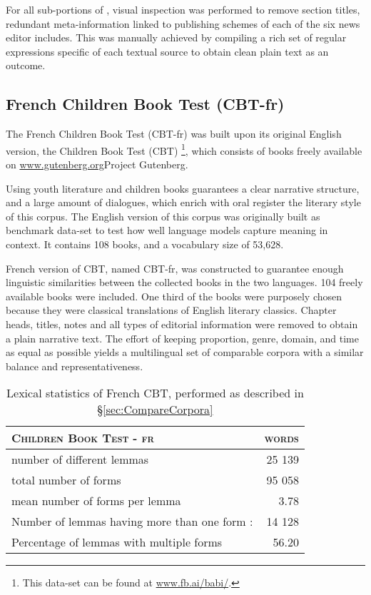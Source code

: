 For all sub-portions of \Cabernet, visual inspection was performed to remove section titles, redundant meta-information linked to publishing schemes of each of the six news editor includes. This was manually achieved by compiling a rich set of regular expressions specific of each textual source to obtain clean plain text as an outcome.


\subsection{French Children Book Test (CBT-fr)}
\label{subsec:DescribeCBT}

The French Children Book Test (CBT-fr) was built upon its original English version, the Children Book Test (CBT) \citet{hill-etal-2016-the}\footnote{This data-set can be found at \url{www.fb.ai/babi/}.}, which consists of books freely available on \url{www.gutenberg.org}{Project Gutenberg}.

Using youth literature and children books guarantees a clear narrative structure, and a large amount of dialogues, which enrich with oral register the literary style of this corpus.
The English version of this corpus was originally built as benchmark data-set to test how well language models capture meaning in context. It contains 108 books, and a vocabulary size of 53,628.

French version of CBT, named CBT-fr, was constructed to guarantee enough linguistic similarities between the collected books in the two languages. 104 freely available books were included. One third of the books were purposely chosen because they were classical translations of English literary classics. %
Chapter heads, titles, notes and all types of editorial information were removed to obtain a plain narrative text. The effort of keeping proportion, genre, domain, and time as equal as possible yields a multilingual set of comparable corpora with a similar balance and representativeness.

\begin{table}[ht]
    \centering\small
        \begin{tabular}{lr}                                                             \\\toprule
            {\textsc{Children Book Test - fr}}           & { \textsc{words}} \\\midrule
            number of different lemmas                   & 25 139            \\
            total number of forms                        & 95 058            \\
            mean number of forms per lemma               & 3.78              \\
            Number of lemmas having more than one form : & 14 128            \\
            Percentage of lemmas with multiple forms     & 56.20             \\
            \bottomrule
        \end{tabular}
    \caption{\label{Table_DescribeCBTfr} Lexical statistics of French CBT, performed as described in §\ref{sec:CompareCorpora}}
\end{table}


